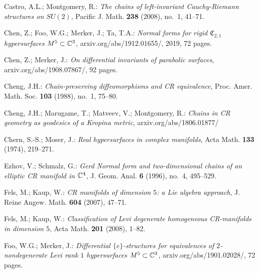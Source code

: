 \begin{thebibliography}{XL}
{
Castro, A.L.; Montgomery, R.:
{\em The chains of left-invariant Cauchy-Riemann structures on 
$SU(2)$}, Pacific J. Math. {\bf 238} (2008), no.~1, 41--71.

\smallskip

Chen, Z.; Foo, W.G.; Merker, J.; Ta, T.A.: 
{\em Normal forms for rigid $\mathfrak{C}_{2,1}$ 
hypersurfaces $M^5 \subset \mathbb{C}^3$},
{\tiny\sf arxiv.org/abs/1912.01655/}, 2019, 72 pages.

\smallskip

Chen, Z.; Merker, J.:
{\em On differential invariants of parabolic surfaces},
{\tiny\sf arxiv.org/abs/1908.07867/},
92 pages.

\smallskip

Cheng, J.H.:
{\em Chain-preserving diffeomorphisms and CR equivalence},
Proc. Amer. Math. Soc. {\bf 103} (1988), no.~1, 75--80.

\smallskip

Cheng, J.H.; Marugame, T.; Matveev, V.; Montgomery, R.:
{\em Chains in CR geometry as geodesics of a Kropina metric},
{\tiny\sf arxiv.org/abs/1806.01877/}

\smallskip

Chern, S.-S.; Moser, J.:
{\em Real hypersurfaces in complex manifolds},
Acta Math. {\bf 133} (1974), 219--271. 

\smallskip

Ezhov, V.; Schmalz, G.:
{\em Gerd Normal form and two-dimensional chains 
of an elliptic CR manifold in $\mathbb{C}^4$},
J. Geom. Anal. {\bf 6} (1996), no.~4, 495--529.

\smallskip

Fels, M.; Kaup, W.:
{\em CR manifolds of dimension $5$: a Lie algebra approach},
J. Reine Angew. Math. {\bf 604} (2007), 47--71.

\smallskip

Fels, M.; Kaup, W.:
{\em Classification of Levi degenerate homogeneous CR-manifolds in 
dimension $5$},
Acta Math. {\bf 201} (2008), 1--82.

\smallskip

Foo, W.G.; Merker, J.:
{\em Differential $\{e\}$-structures for equivalences
of $2$-nondegenerate Levi rank $1$ hypersurfaces $M^5 \subset \mathbb{C}^3$},
{\tiny\sf arxiv.org/abs/1901.02028/}, 72 pages.

}
\end{thebibliography}
